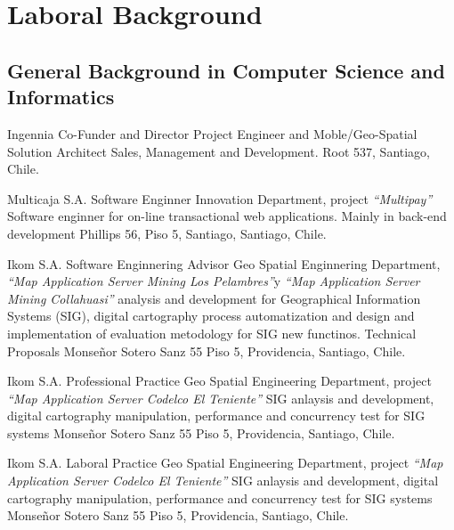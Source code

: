 
\section{Laboral Background}

\subsection{General Background in Computer Science and Informatics}
	{Ingennia} %
	{Co-Funder and Director} %
	{Project Engineer and Moble/Geo-Spatial Solution Architect}
	{Sales, Management and Development.}
	{Root 537, Santiago, Chile.}
	

	{Multicaja S.A.} %
	{Software Enginner} %
	{Innovation Department, project \textit{``Multipay''}}
	{Software enginner for on-line transactional web applications. Mainly in back-end development}
	{Phillips 56, Piso 5, Santiago, Santiago, Chile.}

	{Ikom S.A.}	%
	{Software Enginnering Advisor}
	{Geo Spatial Enginnering Department,
	\textit{``Map Application Server Mining Los Pelambres''}y \textit{``Map Application Server Mining 
	Collahuasi''}}
	{analysis and development for Geographical Information Systems (SIG), digital cartography process automatization and design and implementation of evaluation metodology for SIG new functinos. Technical Proposals}
	{Monse\~nor Sotero Sanz 55 Piso 5, Providencia, Santiago, Chile.}
	

	{Ikom S.A.}	%
	{Professional Practice} %
	{Geo Spatial Engineering Department, project 
	\textit{``Map Application Server Codelco El Teniente''}}
	{SIG anlaysis and development, digital cartography manipulation, performance and concurrency test for SIG systems}
	{Monse\~nor Sotero Sanz 55 Piso 5, Providencia, Santiago, Chile.}
	
	{Ikom S.A.}	%
	{Laboral Practice} %
	{Geo Spatial Engineering Department, project 
	\textit{``Map Application Server Codelco El Teniente''}}
	{SIG anlaysis and development, digital cartography manipulation, performance and concurrency test for SIG systems}
	{Monse\~nor Sotero Sanz 55 Piso 5, Providencia, Santiago, Chile.}
	
